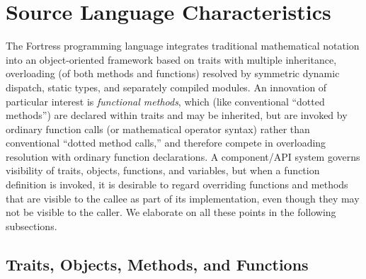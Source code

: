 \section{Source Language Characteristics}

The Fortress programming language integrates traditional mathematical
notation into an object-oriented framework based on traits with
multiple inheritance, overloading (of both methods and functions)
resolved by symmetric dynamic dispatch, static types, and separately
compiled modules.  An innovation of particular interest is
\emph{functional methods}, which (like conventional ``dotted methods'')
are declared within traits and may be inherited, but are invoked by
ordinary function calls (or mathematical operator syntax) rather
than conventional ``dotted method calls,'' and therefore compete
in overloading resolution with ordinary function declarations.
A component/API system governs visibility of traits, objects,
functions, and variables, but when a function definition is invoked,
it is desirable to regard overriding functions and
methods that are visible to the callee as part of its implementation,
even though they may not be visible to the caller.
We elaborate on all these points in the following subsections.

\subsection{Traits, Objects, Methods, and Functions}

